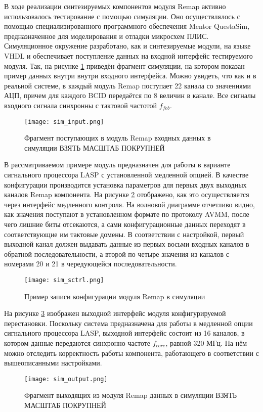 В ходе реализации синтезируемых компонентов модуля Remap активно использовалось тестирование с помощью симуляции. Оно осуществлялось с помощью специализированного программного обеспечения Mentor QuestaSim, предназначенное для моделирования и отладки микросхем ПЛИС. Симуляционное окружение разработано, как и синтезируемые модули, на языке VHDL и обеспечивает поступление данных на входной интерфейс тестируемого модуля. Так, на рисунке \ref{fig:sim_input} приведён фрагмент симуляции, на котором показан пример данных внутри внутри  входного интерфейса. Можно увидеть, что как и в реальной системе, в каждый модуль Remap поступает 22 канала со значениями АЦП, причем для каждого BCID передаётся по 8 величин в канале. Все сигналы входного сигнала синхронны с тактовой частотой $f_{feb}$.\par
\begin{figure}[ht]
    \centering
    \texttt{[image: sim\_input.png]}
    \caption{Фрагмент поступающих в модуль Remap входных данных в симуляции ВЗЯТЬ МАСШТАБ ПОКРУПНЕЙ}
    \label{fig:sim_input}
\end{figure}\par
В рассматриваемом примере модуль предназначен для работы в варианте сигнального процессора LASP с установленной медленной опцией. В качестве конфигурации производится установка параметров для первых двух выходных каналов Remap компонента. На рисунке \ref{fig:sim_sctrl} отображено, как это осуществляется через интерфейс медленного контроля. На волновой диаграмме отчетливо видно, как значения поступают в установленном формате по протоколу AVMM, после чего лишние биты отсекаются, а сами конфигурационные данных переходят в соответствующие им тактовые домены. В соответствии с настройкой, первый выходной канал должен выдавать данные из первых восьми входных каналов в обратной последовательности, а второй по четыре значения из каналов с номерами 20 и 21 в чередующейся последовательности.\par
\begin{figure}[ht]
    \centering
    \texttt{[image: sim\_sctrl.png]}
    \caption{Пример записи конфигурации модуля Remap в симуляции}
    \label{fig:sim_sctrl}
\end{figure}\par
На рисунке \ref{fig:sim_output} изображен выходной интерфейс модуля конфигурируемой перестановки. Поскольку система предназначена для работы в медленной опции сигнального процессора LASP, выходной интерфейс состоит из 16 каналов, в котором данные передаются синхронно частоте $f_{core}$, равной 320 МГц. На нём можно отследить корректность работы компонента, работающего в соответствии с вышеописанными настройками. \par
\begin{figure}[ht]
    \centering
    \texttt{[image: sim\_output.png]}
    \caption{Фрагмент выходящих из модуля Remap данных в симуляции ВЗЯТЬ МАСШТАБ ПОКРУПНЕЙ}
    \label{fig:sim_output}
\end{figure}\par
